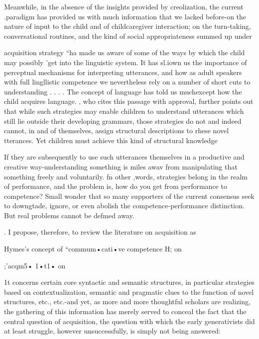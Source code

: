 Meanwhile, in the absence of the insights provided by creolization, the current .paradigm has provided us with much information that we lacked before{}-on the nature of input to the child and of child\-caregiver interaction; on the  turn-taking, conversational routines, and the kind of social appropriateness summed up under


{\textquotedbl}acquisition strategy{\textquotedbl} ``ha made us aware of some of the ways by which the child may possibly 'get into the linguistic system. It has sl.iown us the importance of perceptual mechanisms for interpreting utterances, and how as adult speakers with full lingllistic competence we nevertheless rely on a number of short cuts to understanding . . . . The concept of language  has told us much\-except how the child acquires language. \citet{Bowerman1979} , who cites this passage with approval, further points out that while such strategies may enable children to understand utterances which still lie outside their developing grammars, those strategies do not and indeed cannot, in and of themselves, assign structural descriptions to rhese novel tterances. Yet children must achieve this kind of structural knowledge

If they are subsequently to use such utterances themselves in a produc\-tive and creative way-understanding something is miles awav from manipulating that something freely and voluntarily. fn other ,words, strategies belong in the realm of performance, and the problem is, how do you get from performance to competence? Small wonder that so many supporters of the current consensus seek to downgtade, ignore,
or even abolish the competence-performance distinction. But real problems cannot be defmed away.

. I propose, therefore, to review the literature on acquisition as

Hymes's concept of ``commum•cati•ve competence H; on

;'acqm5• 1•t1• on

1t concerns certain core syntactic and semantic structures, in particular
strategies based on contextualization, semantic and pragmatic clues to the function of novel structures, etc., etc.-and yet, as more and more thoughtful scholars are realizing, the gathering of this information has merely served to conceal the fact that the central question of acquisition, the question with which the early generativists did at least struggle, however unsuccessfully, is simply not being answered:

